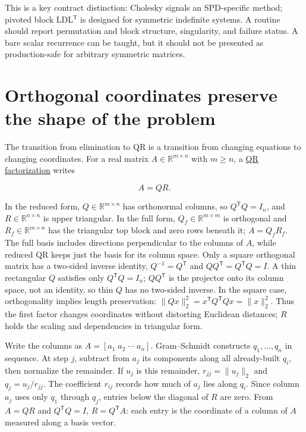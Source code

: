 This is a key contract distinction: Cholesky signals an SPD-specific method; pivoted block LDL\(^\mathsf T\) is designed for symmetric indefinite systems. A routine should report permutation and block structure, singularity, and failure status. A bare scalar recurrence can be taught, but it should not be presented as production-safe for arbitrary symmetric matrices.

\section{Orthogonal coordinates preserve the shape of the problem}\label{01-foundations-i-ch020-orthogonal-coordinates-preserve-the-shape-of-the-problem}

\hypertarget{01-foundations-i-ch020-orthogonal-coordinates-preserve-the-shape-of-the-problem}{}

The transition from elimination to QR is a transition from changing equations to changing coordinates. For a real matrix \(A\in\mathbb R^{m\times n}\) with \(m\ge n\), a \hyperref[01-foundations-i-ch020-reflections-and-plane-rotations-build-qr-without-losing-lengths]{QR factorization} writes

\[
A=QR.
\]

In the reduced form, \(Q\in\mathbb R^{m\times n}\) has orthonormal columns, so \(Q^\mathsf TQ=I_n\), and \(R\in\mathbb R^{n\times n}\) is upper triangular. In the full form, \(Q_f\in\mathbb R^{m\times m}\) is orthogonal and \(R_f\in\mathbb R^{m\times n}\) has the triangular top block and zero rows beneath it; \(A=Q_fR_f\). The full basis includes directions perpendicular to the columns of \(A\), while reduced QR keeps just the basis for its column space. Only a square orthogonal matrix has a two-sided inverse identity, \(Q^{-1}=Q^\mathsf T\) and \(QQ^\mathsf T=Q^\mathsf TQ=I\). A thin rectangular \(Q\) satisfies only \(Q^\mathsf TQ=I_n\); \(QQ^\mathsf T\) is the projector onto its column space, not an identity, so thin \(Q\) has no two-sided inverse. In the square case, orthogonality implies length preservation: \(\|Qx\|_2^2=x^\mathsf TQ^\mathsf TQx=\|x\|_2^2\). Thus the first factor changes coordinates without distorting Euclidean distances; \(R\) holds the scaling and dependencies in triangular form.

Write the columns as \(A=[a_1\;a_2\;\cdots\;a_n]\). Gram--Schmidt constructs \(q_1,\ldots,q_n\) in sequence. At step \(j\), subtract from \(a_j\) its components along all already-built \(q_i\), then normalize the remainder. If \(u_j\) is this remainder, \(r_{jj}=\|u_j\|_2\) and \(q_j=u_j/r_{jj}\). The coefficient \(r_{ij}\) records how much of \(a_j\) lies along \(q_i\). Since column \(a_j\) uses only \(q_1\) through \(q_j\), entries below the diagonal of \(R\) are zero. From \(A=QR\) and \(Q^\mathsf TQ=I\), \(R=Q^\mathsf TA\): each entry is the coordinate of a column of \(A\) measured along a basis vector.

